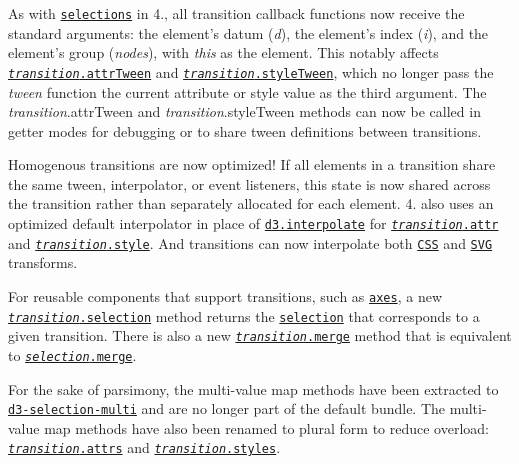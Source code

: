 As with \href{#selections-d3-selection}{\tt selections} in 4., all transition callback functions now receive the standard arguments\+: the element’s datum ({\itshape d}), the element’s index ({\itshape i}), and the element’s group ({\itshape nodes}), with {\itshape this} as the element. This notably affects \href{https://github.com/d3/d3-transition/blob/master/README.md#transition_attrTween}{\tt {\itshape transition}.attr\+Tween} and \href{https://github.com/d3/d3-transition/blob/master/README.md#transition_styleTween}{\tt {\itshape transition}.style\+Tween}, which no longer pass the {\itshape tween} function the current attribute or style value as the third argument. The {\itshape transition}.attr\+Tween and {\itshape transition}.style\+Tween methods can now be called in getter modes for debugging or to share tween definitions between transitions.

Homogenous transitions are now optimized! If all elements in a transition share the same tween, interpolator, or event listeners, this state is now shared across the transition rather than separately allocated for each element. 4. also uses an optimized default interpolator in place of \href{https://github.com/d3/d3-interpolate/blob/master/README.md#interpolate}{\tt d3.\+interpolate} for \href{https://github.com/d3/d3-transition/blob/master/README.md#transition_attr}{\tt {\itshape transition}.attr} and \href{https://github.com/d3/d3-transition/blob/master/README.md#transition_style}{\tt {\itshape transition}.style}. And transitions can now interpolate both \href{https://github.com/d3/d3-interpolate/blob/master/README.md#interpolateTransformCss}{\tt C\+SS} and \href{https://github.com/d3/d3-interpolate/blob/master/README.md#interpolateTransformSvg}{\tt S\+VG} transforms.

For reusable components that support transitions, such as \href{#axes-d3-axis}{\tt axes}, a new \href{https://github.com/d3/d3-transition/blob/master/README.md#transition_selection}{\tt {\itshape transition}.selection} method returns the \href{#selections-d3-selection}{\tt selection} that corresponds to a given transition. There is also a new \href{https://github.com/d3/d3-transition/blob/master/README.md#transition_merge}{\tt {\itshape transition}.merge} method that is equivalent to \href{https://github.com/d3/d3-selection/blob/master/README.md#selection_merge}{\tt {\itshape selection}.merge}.

For the sake of parsimony, the multi-\/value map methods have been extracted to \href{https://github.com/d3/d3-selection-multi}{\tt d3-\/selection-\/multi} and are no longer part of the default bundle. The multi-\/value map methods have also been renamed to plural form to reduce overload\+: \href{https://github.com/d3/d3-selection-multi/blob/master/README.md#transition_attrs}{\tt {\itshape transition}.attrs} and \href{https://github.com/d3/d3-selection-multi/blob/master/README.md#transition_styles}{\tt {\itshape transition}.styles}.

